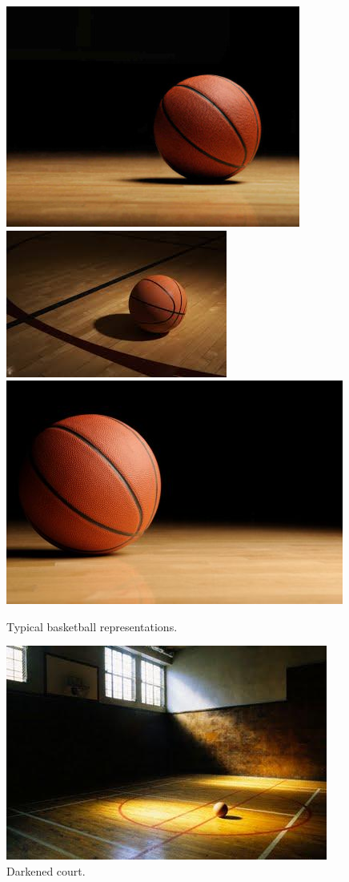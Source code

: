\documentclass[12pt,a4paper]{article}
\begin{document}
\begin{figure}
\center
\begin{minipage}{\textwidth}
\includegraphics[scale=0.3 ]{images/basketball_1.jpg} 
\includegraphics[scale=0.45 ]{images/basketball_2.jpg} 
\includegraphics[scale=0.3 ]{images/basketball_3.jpg} 
\end{minipage}
\caption{Typical basketball representations.}
\label{img_ball}
\end{figure}

\begin{figure}
\center
\includegraphics[scale=0.5]{images/court.png} 
\caption{Darkened court.}
\label{img_arena}
\end{figure}
\end{document}
